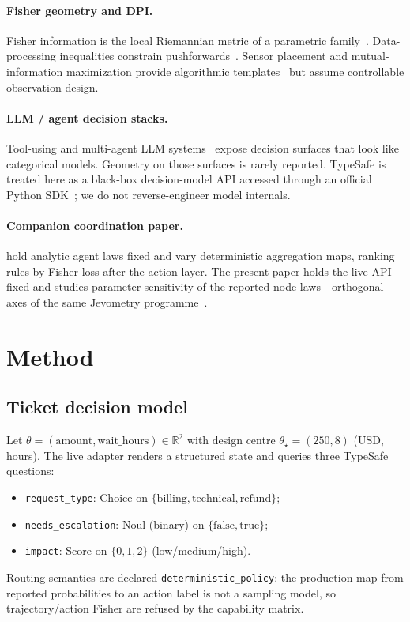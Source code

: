 \documentclass[11pt,a4paper]{article}
\begin{document}
\paragraph{Fisher geometry and DPI.}
Fisher information is the local Riemannian metric of a parametric
family~\citep{fisher1925theory,amari2016information,amari1998natural}.
Data-processing inequalities constrain pushforwards~\citep{zamir1998fisherdpi,cover2006elements}.
Sensor placement and mutual-information maximization provide algorithmic
templates~\citep{krause2008near} but assume controllable observation design.

\paragraph{LLM / agent decision stacks.}
Tool-using and multi-agent LLM systems~\citep{yao2023react,park2023generative}
expose decision surfaces that look like categorical models. Geometry on those
surfaces is rarely reported. TypeSafe is treated here as a black-box
decision-model API accessed through an official Python
SDK~\citep{typesafe2026}; we do not reverse-engineer model internals.

\paragraph{Companion coordination paper.}
\citet{li2026coordfisher} hold analytic agent laws fixed and vary
deterministic aggregation maps, ranking rules by Fisher loss after the action
layer. The present paper holds the live API fixed and studies parameter
sensitivity of the reported node laws---orthogonal axes of the same Jevometry
programme~\citep{jevometry2026}.

\section{Method}

\subsection{Ticket decision model}

Let $\theta=(\mathrm{amount},\mathrm{wait\_hours})\in\mathbb{R}^2$ with
design centre $\theta_\star=(250,8)$ (USD, hours). The live adapter renders a
structured state and queries three TypeSafe questions:
\begin{itemize}
  \item \texttt{request\_type}: Choice on $\{\mathrm{billing},\mathrm{technical},\mathrm{refund}\}$;
  \item \texttt{needs\_escalation}: Noul (binary) on $\{\mathrm{false},\mathrm{true}\}$;
  \item \texttt{impact}: Score on $\{0,1,2\}$ (low/medium/high).
\end{itemize}
Routing semantics are declared \texttt{deterministic\_policy}: the production
map from reported probabilities to an action label is not a sampling model, so
trajectory/action Fisher are refused by the capability matrix.
\end{document}
